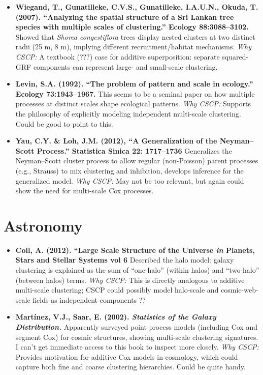 \documentclass[11pt]{article}
\begin{document}
	\begin{itemize}
		\item \textbf{Wiegand, T., Gunatilleke, C.V.S., Gunatilleke, I.A.U.N., Okuda, T. (2007). ``Analyzing the spatial structure of a Sri Lankan tree species with multiple scales of clustering.'' Ecology 88:3088--3102.}  
		Showed that \emph{Shorea congestiflora} trees display nested clusters at two distinct radii (25 m, 8 m), implying different recruitment/habitat mechanisms.  
		\emph{Why CSCP:} A textbook (???) case for additive superposition: separate squared-GRF components can represent large- and small-scale clustering.
		
		\item \textbf{Levin, S.A. (1992). ``The problem of pattern and scale in ecology.'' Ecology 73:1943--1967.}  
		This seems to be a seminal paper on how multiple processes at distinct scales shape ecological patterns.  
		\emph{Why CSCP:} Supports the philosophy of explicitly modeling independent multi-scale clustering. Could be good to point to this.
		
		\item \textbf{Yau, C.Y. \& Loh, J.M. (2012), ``A Generalization of the Neyman–Scott Process.'' Statistica Sinica 22: 1717–1736}  
		Generalizes the Neyman–Scott cluster process to allow regular (non-Poisson) parent processes (e.g., Strauss) to mix clustering and inhibition, develops inference for the generalized model.  
		\emph{Why CSCP:} May not be too relevant, but again could show the need for multi-scale Cox processes.
	\end{itemize}
	
	\section*{Astronomy}
	
	\begin{itemize}
		\item \textbf{Coil, A. (2012). ``Large Scale Structure of the Universe \textit{in} Planets, Stars and Stellar Systems vol 6}  
		Described the halo model: galaxy clustering is explained as the sum of ``one-halo'' (within halos) and ``two-halo'' (between halos) terms.  
		\emph{Why CSCP:} This is directly analogous to additive multi-scale clustering; CSCP could possibly model halo-scale and cosmic-web-scale fields as independent components   ??
		
		\item \textbf{Martínez, V.J., Saar, E. (2002). \emph{Statistics of the Galaxy Distribution.}}  
		Apparently surveyed point process models (including Cox and segment Cox) for cosmic structures, showing multi-scale clustering signatures.  I can't get immediate access to this book to inspect more closely.
		\emph{Why CSCP:} Provides motivation for additive Cox models in cosmology, which could capture both fine and coarse clustering hierarchies. Could be quite handy.
	\end{itemize}
	
\end{document}
